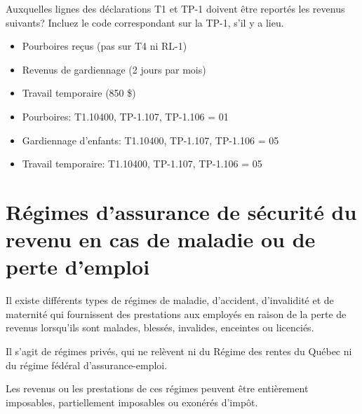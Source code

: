 \begin{question}
	Auxquelles lignes des déclarations T1 et TP-1 doivent être reportés les revenus suivants? 
	Incluez le code correspondant sur la TP-1, s'il y a lieu.
	\begin{itemize}
		\item Pourboires reçus (pas sur T4 ni RL-1)
		\item Revenus de gardiennage (2 jours par mois)
		\item Travail temporaire (850 \$)
	\end{itemize}
\end{question}
\begin{itemize}
	\item Pourboires: T1.10400, TP-1.107, TP-1.106 = 01
	\item Gardiennage d'enfants: T1.10400, TP-1.107, TP-1.106 = 05
	\item Travail temporaire: T1.10400, TP-1.107, TP-1.106 = 05
\end{itemize}



\section{Régimes d'assurance de sécurité du revenu en cas de maladie ou de perte d'emploi}
\begin{intro}
	Il existe différents types de régimes de maladie, d'accident, d'invalidité et de maternité qui fournissent des prestations aux employés en raison de la perte de revenus lorsqu'ils sont malades, blessés, invalides, enceintes ou licenciés.
	
	Il s'agit de régimes privés, qui ne relèvent ni du Régime des rentes du Québec ni du régime fédéral d'assurance-emploi. 
	
	Les revenus ou les prestations de ces régimes peuvent être entièrement imposables, partiellement imposables ou exonérés d'impôt.
\end{intro}


